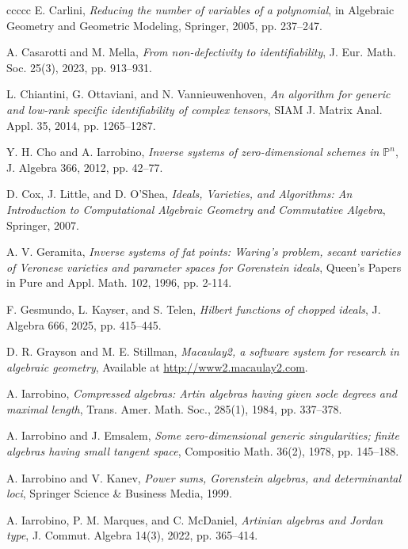 \documentclass{amsart}
\theoremstyle{plain}
\renewcommand{\P}{\mathbb{P}}
\def\P{{\mathbb{P}}}
\numberwithin{equation}{section}
\begin{document}
\begin{thebibliography}{ccccc}
 E. Carlini,
\emph{Reducing the number of variables of a polynomial},
in Algebraic Geometry and Geometric Modeling, Springer, 2005, pp. 237--247.

 A. Casarotti and M. Mella,
\emph{From non-defectivity to identifiability},
J. Eur. Math. Soc. 25(3), 2023, pp. 913--931.

 L. Chiantini, G. Ottaviani, and N. Vannieuwenhoven,
\emph{An algorithm for generic and low-rank specific identifiability of complex tensors},
SIAM J. Matrix Anal. Appl. 35, 2014, pp. 1265--1287.

 Y. H. Cho and A. Iarrobino,
\emph{Inverse systems of zero-dimensional schemes in $\P^n$},
J. Algebra 366, 2012, pp. 42--77.

 D. Cox, J. Little, and D. O'Shea,
\emph{Ideals, Varieties, and Algorithms: An Introduction to Computational Algebraic Geometry and Commutative Algebra},
Springer, 2007.


 A. V. Geramita, 
\emph{Inverse systems of fat points: Waring’s problem, secant varieties of Veronese varieties and parameter spaces for Gorenstein ideals},
Queen’s Papers in Pure and Appl. Math. 102, 1996, pp. 2-114.

 F. Gesmundo, L. Kayser, and S. Telen,
\emph{Hilbert functions of chopped ideals},
J. Algebra 666, 2025, pp. 415--445.

 D. R. Grayson and M. E. Stillman,
\emph{Macaulay2, a software system for research in algebraic geometry},
Available at \url{http://www2.macaulay2.com}.
          
 A. Iarrobino,
\emph{Compressed algebras: Artin algebras having given socle degrees and maximal length},
Trans. Amer. Math. Soc., 285(1), 1984, pp. 337--378.

 A. Iarrobino and J. Emsalem,
\emph{Some zero-dimensional generic singularities; finite algebras having small tangent space},
Compositio Math. 36(2), 1978, pp. 145--188.

 A. Iarrobino and V. Kanev,
\emph{Power sums, Gorenstein algebras, and determinantal loci},
Springer Science \& Business Media, 1999. 

 A. Iarrobino, P. M. Marques, and C. McDaniel,
\emph{Artinian algebras and Jordan type},
J. Commut. Algebra 14(3), 2022, pp. 365--414.


\end{thebibliography}
\end{document}
